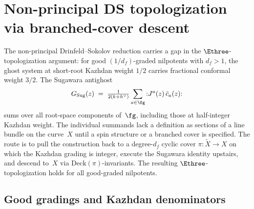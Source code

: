 %
%

\section{Non-principal DS topologization via branched-cover descent}
\label{sec:fractional-ghost-platonic}


The non-principal Drinfeld--Sokolov reduction carries a gap in the
$\Ethree$-topologization argument: for good $(1/d_f)$-graded nilpotents
with $d_f > 1$, the ghost system at short-root Kazhdan weight $1/2$
carries fractional conformal weight $3/2$. The Sugawara antighost
\[
G_{\mathrm{Sug}}(z) \;=\; \tfrac{1}{2(k+h^{\vee})}
 \sum_{a \in \fg} {:}J^{a}(z)\,\bar c_{a}(z){:}
\]
sums over all root-space components of~$\fg$, including those at
half-integer Kazhdan weight. The individual summands lack a definition
as sections of a line bundle on the curve~$X$ until a spin structure
or a branched cover is specified. The route is to pull the construction
back to a degree-$d_f$ cyclic cover $\pi\colon \widetilde X \to X$ on
which the Kazhdan grading is integer, execute the Sugawara identity
upstairs, and descend to~$X$ via $\mathrm{Deck}(\pi)$-invariants. The
resulting $\Ethree$-topologization holds for all good-graded
nilpotents.

\subsection{Good gradings and Kazhdan denominators}
\label{subsec:good-grading-denominator}

